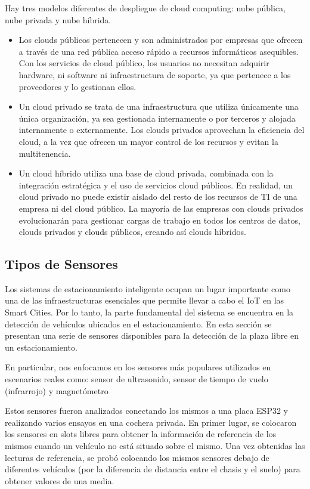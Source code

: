 Hay tres modelos diferentes de despliegue de cloud computing: nube pública, nube privada y nube híbrida.
\begin{itemize}
    \item Los clouds públicos pertenecen y son administrados por empresas que ofrecen a través de una red pública acceso rápido a recursos informáticos asequibles. Con los servicios de cloud público, los usuarios no necesitan adquirir hardware, ni software ni infraestructura de soporte, ya que pertenece a los proveedores y lo gestionan ellos.
    \item Un cloud privado se trata de una infraestructura que utiliza únicamente una única organización, ya sea gestionada internamente o por terceros y alojada internamente o externamente. Los clouds privados aprovechan la eficiencia del cloud, a la vez que ofrecen un mayor control de los recursos y evitan la multitenencia.
    \item Un cloud híbrido utiliza una base de cloud privada, combinada con la integración estratégica y el uso de servicios cloud públicos. En realidad, un cloud privado no puede existir aislado del resto de los recursos de TI de una empresa ni del cloud público. La mayoría de las empresas con clouds privados evolucionarán para gestionar cargas de trabajo en todos los centros de datos, clouds privados y clouds públicos, creando así clouds híbridos.
\end{itemize}

\subsection{Tipos de Sensores}
Los sistemas de estacionamiento inteligente  ocupan un lugar importante como una de las infraestructuras esenciales que permite llevar a cabo el IoT en las Smart Cities. Por lo tanto, la parte fundamental del sistema se encuentra en la detección de vehículos ubicados en el estacionamiento. En esta sección se presentan una serie de sensores disponibles para la detección de la plaza libre en un estacionamiento. 

En particular, nos enfocamos en los sensores más populares utilizados en escenarios reales como: sensor de ultrasonido, sensor de tiempo de vuelo (infrarrojo) y magnetómetro

Estos sensores fueron analizados conectando los mismos a una placa ESP32 y realizando varios ensayos en una cochera privada. En primer lugar, se colocaron los sensores en slots libres para obtener la información de referencia de los mismos cuando un vehículo no está situado sobre el mismo. Una vez obtenidas las lecturas de referencia, se probó colocando los mismos sensores debajo de diferentes vehículos (por la diferencia de distancia entre el chasis y el suelo) para obtener valores de una media.

